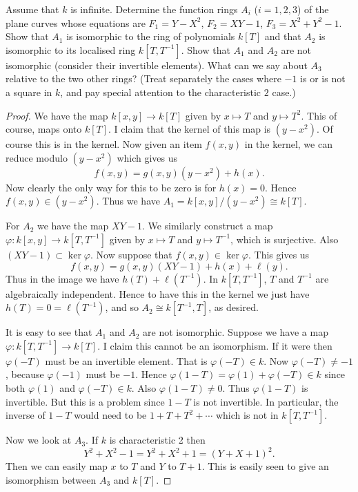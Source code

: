 \documentclass{article}
\begin{document}
\begin{problem}
  Assume that $k$ is infinite. Determine the function rings $A_i$
  ($i=1,2,3$) of the plane curves whose equations are $F_1=Y-X^2$,
  $F_2=XY-1$, $F_3=X^2+Y^2-1$. Show that $A_1$ is isomorphic to the ring of
  polynomials $k[T]$ and that $A_2$ is isomorphic to its localised ring
  $k[T,T^{-1}]$. Show that $A_1$ and $A_2$ are not isomorphic (consider
  their invertible elements). What can we say about $A_3$ relative to the
  two other rings? (Treat separately the cases where $-1$ is or is not a
  square in $k$, and pay special attention to the characteristic $2$ case.)
  \begin{proof}
    We have the map $k[x,y]\rightarrow k[T]$ given by $x\mapsto T$ and $y\mapsto
    T^2$. This of course, maps onto $k[T]$. I claim that the kernel of this map
    is $(y-x^2)$. Of course this is in the kernel. Now given an item
    $f(x,y)$ in the kernel, we can reduce modulo $(y-x^2)$ which gives us 
    \[f(x,y)=g(x,y)(y-x^2)+h(x).\]
    Now clearly the only way for this to be zero is for $h(x)=0$. Hence
    $f(x,y)\in(y-x^2)$. Thus we have $A_1=k[x,y]/(y-x^2)\cong k[T]$.

    For $A_2$ we have the map $XY-1$. We similarly construct a map
    $\varphi:k[x,y]\rightarrow k[T,T^{-1}]$ given by $x\mapsto T$ and $y\mapsto
    T^{-1}$, which is surjective. Also $(XY-1)\subset\ker\varphi$. Now suppose
    that $f(x,y)\in\ker\varphi$. This gives us
    \[f(x,y)=g(x,y)(XY-1)+h(x)+\ell(y).\]
    Thus in the image we have $h(T)+\ell(T^{-1})$. In $k[T,T^{-1}]$, $T$ and
    $T^{-1}$ are algebraically independent. Hence to have this in the kernel we
    just have $h(T)=0=\ell(T^{-1})$, and so $A_2\cong k[T^{-1},T]$, as desired.

    It is easy to see that $A_1$ and $A_2$ are not isomorphic. Suppose we 
    have a map $\varphi:k[T,T^{-1}]\rightarrow k[T]$. I claim this cannot be an
    isomorphism. If it were then $\varphi(-T)$ must be an invertible element.
    That is $\varphi(-T)\in k$. Now $\varphi(-T)\ne-1$, because $\varphi(-1)$ must
    be $-1$. Hence $\varphi(1-T)=\varphi(1)+\varphi(-T)\in k$ since both
    $\varphi(1)$ and $\varphi(-T)\in k$. Also $\varphi(1-T)\ne0$. Thus
    $\varphi(1-T)$ is invertible. But this is a problem since $1-T$ is not
    invertible. In particular, the inverse of $1-T$ would need to be
    $1+T+T^2+\cdots$ which is not in $k[T,T^{-1}]$.

    Now we look at $A_{3}$. If $k$ is characteristic 2 then
    \[
      Y^2+X^2-1= Y^2+X^2+1=(Y+X+1)^2.
    \]
    Then we can easily map $x$ to $T$ and $Y$ to $T+1$. This is easily seen to
    give an isomorphism between $A_3$ and $k[T]$.
  \end{proof}
\end{problem}
\end{document}
